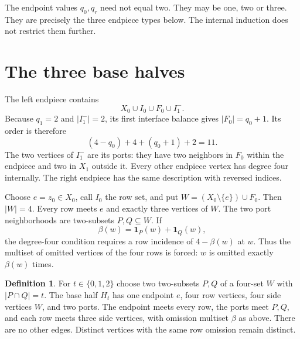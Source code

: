 \documentclass[11pt]{article}
\theoremstyle{definition}\newtheorem{definition}[theorem]{Definition}
\begin{document}
The endpoint values $q_0,q_r$ need not equal two. They may be one,
two or three. They are precisely the three endpiece types below.
The internal induction does not restrict them further.

\section{The three base halves}

The left endpiece contains
\[
 X_0\cup I_0\cup F_0\cup I_1^-.
\]
Because $q_1=2$ and $|I_1^-|=2$, its first interface balance gives
$|F_0|=q_0+1$. Its order is therefore
\[
 (4-q_0)+4+(q_0+1)+2=11.
\]
The two vertices of $I_1^-$ are its ports: they have two neighbors
in $F_0$ within the endpiece and two in $X_1$ outside it. Every
other endpiece vertex has degree four internally. The right endpiece
has the same description with reversed indices.

Choose $e=z_0\in X_0$, call $I_0$ the row set, and put
$W=(X_0\setminus\{e\})\cup F_0$. Then $|W|=4$. Every row meets
$e$ and exactly three vertices of $W$. The two port neighborhoods
are two-subsets $P,Q\subseteq W$. If
\[
 \beta(w)=\boldsymbol1_P(w)+\boldsymbol1_Q(w),
\]
the degree-four condition requires a row incidence of $4-\beta(w)$
at $w$. Thus the multiset of omitted vertices of the four rows is
forced: $w$ is omitted exactly $\beta(w)$ times.

\begin{definition}
For $t\in\{0,1,2\}$ choose two two-subsets $P,Q$ of a four-set $W$
with $|P\cap Q|=t$. The base half $H_t$ has one endpoint $e$, four
row vertices, four side vertices $W$, and two ports. The endpoint
meets every row, the ports meet $P,Q$, and each row meets three side
vertices, with omission multiset $\beta$ as above. There are no other
edges. Distinct vertices with the same row omission remain distinct.
\end{definition}
\end{document}
